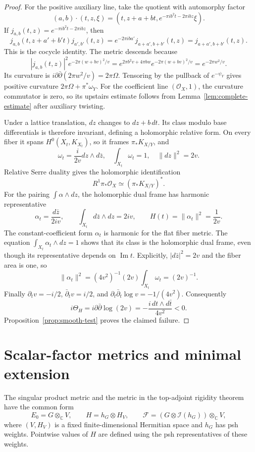 \documentclass[11pt,reqno]{amsart}
\numberwithin{equation}{section}
\theoremstyle{definition}
\theoremstyle{remark}
\newcommand{\OO}{\mathcal O}
\newcommand{\ddbar}{\partial\bar\partial}
\begin{document}
\begin{proof}
For the positive auxiliary line, take the quotient with automorphy
factor
\[
 (a,b)\cdot(t,z,\xi)
 =(t,z+a+bt,e^{-\pi ib^2t-2\pi ibz}\xi).
\]
If $j_{a,b}(t,z)=e^{-\pi ib^2t-2\pi ibz}$, then
\[
 j_{a,b}(t,z+a'+b't)j_{a',b'}(t,z)
   =e^{-2\pi iba'}j_{a+a',b+b'}(t,z)
   =j_{a+a',b+b'}(t,z).
\]
This is the cocycle identity.  The metric descends because
\[
 |j_{a,b}(t,z)|^2e^{-2\pi(w+bv)^2/v}
  =e^{2\pi b^2v+4\pi bw}e^{-2\pi(w+bv)^2/v}
  =e^{-2\pi w^2/v}.
\]
Its curvature is $i\partial\bar\partial(2\pi w^2/v)=2\pi\Omega$.
Tensoring by the pullback of $e^{-\psi_Y}$ gives positive curvature
$2\pi\Omega+\pi^*\omega_Y$.  For the coefficient line $(\OO_X,1)$,
the curvature commutator is zero, so its upstairs estimate follows
from Lemma~\ref{lem:complete-estimate} after auxiliary twisting.

Under a lattice translation, $dz$ changes to $dz+b\,dt$.
Its class modulo base differentials is therefore invariant, defining
a holomorphic relative form.  On every fiber it spans
$H^0(X_t,K_{X_t})$, so it frames $\pi_*K_{X/Y}$, and
\[
 \omega_t=\frac{i}{2v}dz\wedge d\bar z,\quad
 \int_{X_t}\omega_t=1,\quad\|dz\|^2=2v.
\]
Relative Serre duality gives the holomorphic identification
\[
 R^1\pi_*\OO_X\simeq(\pi_*K_{X/Y})^*.
\]
For the pairing $\int\alpha\wedge dz$, the holomorphic dual frame
has harmonic representative
\[
 \alpha_t=\frac{d\bar z}{2iv},\qquad
 \int_{X_t}d\bar z\wedge dz=2iv,\qquad H(t)=\|\alpha_t\|^2=\frac1{2v}.
\]
The constant-coefficient form $\alpha_t$ is harmonic for the flat
fiber metric.  The equation $\int_{X_t}\alpha_t\wedge dz=1$ shows
that its class is the holomorphic dual frame, even though its
representative depends on $\operatorname{Im}t$.
Explicitly, $|d\bar z|^2=2v$ and the fiber area is one, so
\[
 \|\alpha_t\|^2=(4v^2)^{-1}(2v)\int_{X_t}\omega_t=(2v)^{-1}.
\]
Finally $\partial_t v=-i/2$, $\bar\partial_t v=i/2$, and
$\partial_t\bar\partial_t\log v=-1/(4v^2)$.  Consequently
\[
 i\Theta_H=i\ddbar\log(2v)
              =-\frac{i\,dt\wedge d\bar t}{4v^2}<0.
\]
Proposition~\ref{prop:smooth-test} proves the claimed failure.
\end{proof}


\section{Scalar-factor metrics and minimal extension}\label{sec:extension}

The singular product metric and the metric in the top-adjoint
rigidity theorem have the common form
\begin{equation}\label{eq:scalar-factor-metric}
 E_0=G\otimes_{\mathbb C}V,\qquad
 H=h_G\otimes H_V,\qquad
 \mathcal F=(G\otimes\mathcal I(h_G))\otimes_{\mathbb C}V,
\end{equation}
where $(V,H_V)$ is a fixed finite-dimensional Hermitian space and
$h_G$ has psh weights.  Pointwise values of $H$ are defined using
the psh representatives of these weights.
\end{document}
